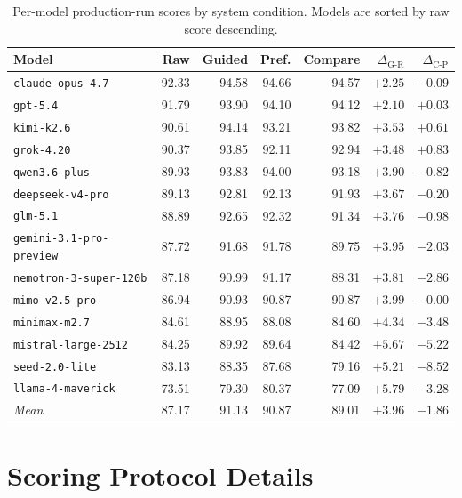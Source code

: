 \documentclass[11pt]{article}
\begin{document}
\begin{table}[htbp]
\centering
\small
\setlength{\tabcolsep}{4pt}
\begin{tabular}{lrrrrrr}
\toprule
Model & Raw & Guided & Pref. & Compare &
  $\Delta_\text{G-R}$ & $\Delta_\text{C-P}$ \\
\midrule
\texttt{claude-opus-4.7}         & 92.33 & 94.58 & 94.66 & 94.57 & $+2.25$ & $-0.09$ \\
\texttt{gpt-5.4}                 & 91.79 & 93.90 & 94.10 & 94.12 & $+2.10$ & $+0.03$ \\
\texttt{kimi-k2.6}               & 90.61 & 94.14 & 93.21 & 93.82 & $+3.53$ & $+0.61$ \\
\texttt{grok-4.20}               & 90.37 & 93.85 & 92.11 & 92.94 & $+3.48$ & $+0.83$ \\
\texttt{qwen3.6-plus}            & 89.93 & 93.83 & 94.00 & 93.18 & $+3.90$ & $-0.82$ \\
\texttt{deepseek-v4-pro}         & 89.13 & 92.81 & 92.13 & 91.93 & $+3.67$ & $-0.20$ \\
\texttt{glm-5.1}                 & 88.89 & 92.65 & 92.32 & 91.34 & $+3.76$ & $-0.98$ \\
\texttt{gemini-3.1-pro-preview}  & 87.72 & 91.68 & 91.78 & 89.75 & $+3.95$ & $-2.03$ \\
\texttt{nemotron-3-super-120b}   & 87.18 & 90.99 & 91.17 & 88.31 & $+3.81$ & $-2.86$ \\
\texttt{mimo-v2.5-pro}           & 86.94 & 90.93 & 90.87 & 90.87 & $+3.99$ & $-0.00$ \\
\texttt{minimax-m2.7}            & 84.61 & 88.95 & 88.08 & 84.60 & $+4.34$ & $-3.48$ \\
\texttt{mistral-large-2512}      & 84.25 & 89.92 & 89.64 & 84.42 & $+5.67$ & $-5.22$ \\
\texttt{seed-2.0-lite}           & 83.13 & 88.35 & 87.68 & 79.16 & $+5.21$ & $-8.52$ \\
\texttt{llama-4-maverick}        & 73.51 & 79.30 & 80.37 & 77.09 & $+5.79$ & $-3.28$ \\
\midrule
\textit{Mean}                    & 87.17 & 91.13 & 90.87 & 89.01 & $+3.96$ & $-1.86$ \\
\bottomrule
\end{tabular}
\caption{Per-model production-run scores by system condition. Models are sorted
by raw score descending.}
\label{tab:models-full}
\end{table}

\FloatBarrier
\section{Scoring Protocol Details}
\label{app:scoring}
\end{document}
